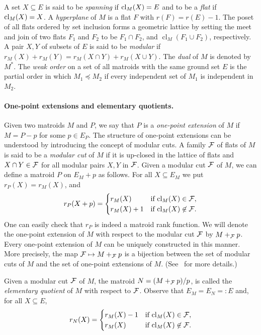 \documentclass{daj}
\DeclareMathOperator{\cl}{cl}
\begin{document}
A set $X\subseteq E$ is said to be  {\em spanning} if ${\rm cl}_M(X)=E$ and to be a {\em flat} if ${\rm cl}_M(X)=X$. A {\em hyperplane} of $M$ is a flat $F$ with $r(F)=r(E)-1$. 
The poset of all flats ordered by set inclusion forms a geometric lattice by setting the meet and join of two flats $F_1$ and $F_2$ to be
 $F_1\cap F_2$, and 
 $\cl_M(F_1\cup F_2)$, respectively.
A pair $X,Y$ of  subsets of $E$ is said to be {\em modular} if
$r_M(X)+r_M(Y)=r_M(X\cap Y)+r_M(X\cup Y)$.
The {\em dual} of
$M$  is denoted by $M^*$.
The {\em weak order} on a set of all matroids with the same ground set $E$ is the partial order in which $M_1\preceq M_2$ if every independent set of $M_1$ is independent in $M_2$.

\paragraph{One-point extensions and elementary quotients.}
Given two matroids $M$ and $P$, we say that $P$ is a {\em one-point extension} of $M$ if $M=P- p$ for some $p\in E_P$.
The structure of one-point extensions can be understood by introducing the concept of modular cuts.
A family ${\cal F}$ of flats of $M$ is said to be a {\em modular cut} of $M$ if
it is up-closed in the lattice of flats and $X\cap Y\in {\cal F}$ for all modular pairs $X, Y$ in ${\cal F}$.
Given a modular cut ${\cal F}$ of $M$, we can define a matroid $P$ on $E_M+p$ as follows. For all $X\subseteq E_M$ we put
$r_P(X)=r_M(X)$,  and
\[
r_P(X+p)=\begin{cases}
r_M(X) & \mbox{if ${\rm cl}_M(X)\in {\cal F}$}, \\
r_M(X)+1 & \mbox{if ${\rm cl}_M(X)\not\in {\cal F}$.}
\end{cases}
\]
One can easily check that $r_P$ is indeed a matroid rank function.
We will denote the one-point extension of $M$ with respect to the modular cut $\cal F$ by $M+_{\cal F} p$.
Every one-point extension of $M$ can be uniquely constructed in this manner.
More precisely, the map ${\cal F}\mapsto M+_{\cal F} p$ is a bijection between the set of modular cuts of $M$ and the set of one-point extensions of $M$.
(See~\cite{O11} for more details.)


Given a modular cut $\cal F$ of $M$, the matroid $N=(M+_{\cal F} p)/p$,
is called the {\em elementary quotient} of $M$ with respect to ${\cal F}$.
Observe that $E_M=E_N=:E$ and, for all $X\subseteq E$,
\begin{equation}\label{eq:quotient}
r_N(X)=\begin{cases}
r_M(X)-1 & \mbox{if ${\rm cl}_M(X)\in {\cal F}$}, \\
r_M(X) & \mbox{if ${\rm cl}_M(X)\not\in {\cal F}$.}
\end{cases}
\end{equation}
\end{document}
